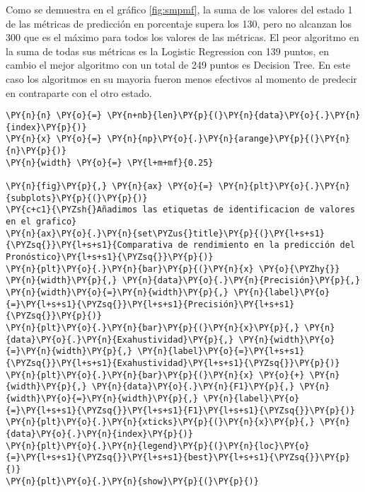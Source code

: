    Como se demuestra en el gráfico \ref{fig:smpmf}, la suma de los valores del estado 1 de
las métricas de predicción en porcentaje supera los 130, pero no
alcanzan los 300 que es el máximo para todos los valores de las
métricas. El peor algoritmo en la suma de todas sus métricas es la
Logistic Regression con 139 puntos, en cambio el mejor algoritmo con un
total de 249 puntos es Decision Tree. En este caso los algoritmos en su
mayoria fueron menos efectivos al momento de predecir en contraparte con
el otro estado.

    \begin{tcolorbox}[breakable, size=fbox, boxrule=1pt, pad at break*=1mm,colback=cellbackground, colframe=cellborder]
\begin{Verbatim}[commandchars=\\\{\}]
\PY{n}{n} \PY{o}{=} \PY{n+nb}{len}\PY{p}{(}\PY{n}{data}\PY{o}{.}\PY{n}{index}\PY{p}{)}
\PY{n}{x} \PY{o}{=} \PY{n}{np}\PY{o}{.}\PY{n}{arange}\PY{p}{(}\PY{n}{n}\PY{p}{)}
\PY{n}{width} \PY{o}{=} \PY{l+m+mf}{0.25}

\PY{n}{fig}\PY{p}{,} \PY{n}{ax} \PY{o}{=} \PY{n}{plt}\PY{o}{.}\PY{n}{subplots}\PY{p}{(}\PY{p}{)}
\PY{c+c1}{\PYZsh{}Añadimos las etiquetas de identificacion de valores en el grafico}
\PY{n}{ax}\PY{o}{.}\PY{n}{set\PYZus{}title}\PY{p}{(}\PY{l+s+s1}{\PYZsq{}}\PY{l+s+s1}{Comparativa de rendimiento en la predicción del Pronóstico}\PY{l+s+s1}{\PYZsq{}}\PY{p}{)}
\PY{n}{plt}\PY{o}{.}\PY{n}{bar}\PY{p}{(}\PY{n}{x} \PY{o}{\PYZhy{}} \PY{n}{width}\PY{p}{,} \PY{n}{data}\PY{o}{.}\PY{n}{Precisión}\PY{p}{,} \PY{n}{width}\PY{o}{=}\PY{n}{width}\PY{p}{,} \PY{n}{label}\PY{o}{=}\PY{l+s+s1}{\PYZsq{}}\PY{l+s+s1}{Precisión}\PY{l+s+s1}{\PYZsq{}}\PY{p}{)}
\PY{n}{plt}\PY{o}{.}\PY{n}{bar}\PY{p}{(}\PY{n}{x}\PY{p}{,} \PY{n}{data}\PY{o}{.}\PY{n}{Exahustividad}\PY{p}{,} \PY{n}{width}\PY{o}{=}\PY{n}{width}\PY{p}{,} \PY{n}{label}\PY{o}{=}\PY{l+s+s1}{\PYZsq{}}\PY{l+s+s1}{Exahustividad}\PY{l+s+s1}{\PYZsq{}}\PY{p}{)}
\PY{n}{plt}\PY{o}{.}\PY{n}{bar}\PY{p}{(}\PY{n}{x} \PY{o}{+} \PY{n}{width}\PY{p}{,} \PY{n}{data}\PY{o}{.}\PY{n}{F1}\PY{p}{,} \PY{n}{width}\PY{o}{=}\PY{n}{width}\PY{p}{,} \PY{n}{label}\PY{o}{=}\PY{l+s+s1}{\PYZsq{}}\PY{l+s+s1}{F1}\PY{l+s+s1}{\PYZsq{}}\PY{p}{)}
\PY{n}{plt}\PY{o}{.}\PY{n}{xticks}\PY{p}{(}\PY{n}{x}\PY{p}{,} \PY{n}{data}\PY{o}{.}\PY{n}{index}\PY{p}{)}
\PY{n}{plt}\PY{o}{.}\PY{n}{legend}\PY{p}{(}\PY{n}{loc}\PY{o}{=}\PY{l+s+s1}{\PYZsq{}}\PY{l+s+s1}{best}\PY{l+s+s1}{\PYZsq{}}\PY{p}{)}
\PY{n}{plt}\PY{o}{.}\PY{n}{show}\PY{p}{(}\PY{p}{)}
\end{Verbatim}
\end{tcolorbox}


